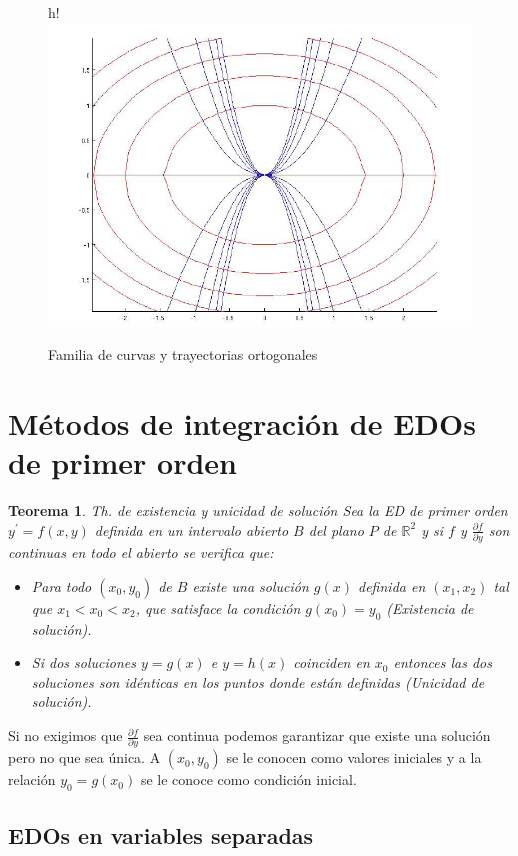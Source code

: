 \documentclass[a4paper,12pt,titlepage]{article}
\newtheorem{theorem}{Teorema}
\begin{document}
\begin{figure}{h!}
    \centering
    \includegraphics[width=0.65\linewidth]{Images/trayectortogonales.png}
    \caption{Familia de curvas y trayectorias ortogonales}
\end{figure}

\section{Métodos de integración de EDOs de primer orden}

\begin{theorem}{Th. de existencia y unicidad de solución}
    Sea la ED de primer orden $y^{\prime}=f(x,y)$ definida en un intervalo abierto $B$ del plano $P$ de $\mathbb{R}^2$ y si $f$ y $\frac{\partial f}{\partial y}$ son continuas en todo el abierto se verifica que:
    \begin{itemize}
        \item Para todo $(x_0,y_0)$ de $B$ existe una solución $g(x)$ definida en $(x_1,x_2)$ tal que $x_1<x_0<x_2$, que satisface la condición $g(x_0)=y_0$ (Existencia de solución).
        \item Si dos soluciones $y=g(x)$ e $y=h(x)$ coinciden en $x_0$ entonces las dos soluciones son idénticas en los puntos donde están definidas (Unicidad de solución).
    \end{itemize}
\end{theorem}

Si no exigimos que $\frac{\partial f}{\partial y}$ sea continua podemos garantizar que existe una solución pero no que sea única. A 
$(x_0,y_0)$ se le conocen como valores iniciales y a la relación $y_0=g(x_0)$ se le conoce como condición inicial.

\subsection{EDOs en variables separadas}
\end{document}
